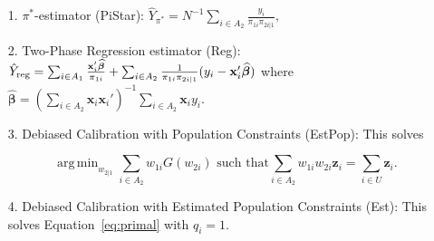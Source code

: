 \documentclass[12pt]{article}
\DeclareMathOperator*{\argmin}{arg\,min}
\renewcommand{\bf}[1]{\mathbf{#1}}
\begin{document}
\begin{itemize}
  \item[1.] $\pi^*$-estimator (PiStar): $\hat Y_{\pi^*} = N^{-1} \sum_{i \in A_2}
    \frac{y_i}{\pi_{1i} \pi_{2i|1}},$
  \item[2.] Two-Phase Regression estimator (Reg): 
    $\hat Y_{\rm reg} = 
    \sum_{i \in A_1} \frac{\bf x_i' \widehat{\bm \beta}}{\pi_{1i}} + 
    \sum_{i \in A_2} \frac{1}{\pi_{1i}\pi_{2i|1}}(y_i - \bf x_i' \widehat{\bm \beta})$ 
    where $\widehat{\bm \beta} = 
    \left(\sum_{i \in A_2} \bf x_i \bf x_i'\right)^{-1} \sum_{i \in A_2} \bf x_i y_i$.
  \item[3.] Debiased Calibration with Population Constraints (EstPop): This 
    solves 

  \begin{equation}
    \argmin_{w_{2|1}} \sum_{i \in A_2} w_{1i} G(w_{2i}) \text{ such that}
    \sum_{i \in A_2} w_{1i} w_{2i} \bf z_i = \sum_{i \in U} \bf z_i.
  \end{equation}

  \item[4.] Debiased Calibration with Estimated Population Constraints (Est):
    This solves Equation~\eqref{eq:primal} with $q_i = 1$.
\end{itemize}
\end{document}
